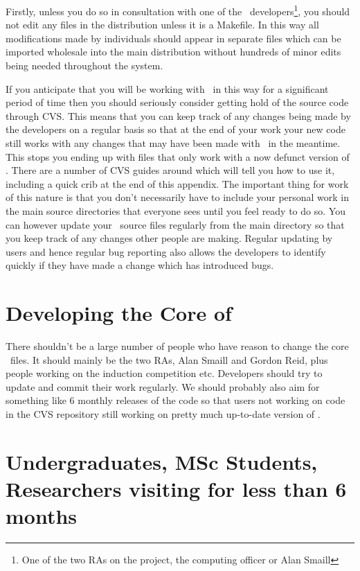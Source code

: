 Firstly, unless you do so in consultation with one of the \lclam\
developers\footnote{One of the two RAs on the project, the computing
  officer or Alan Smaill}, you should not edit any files in the distribution unless it 
is a Makefile\index{Makefile}.  In this way all 
modifications made by individuals should appear in separate files
which can be imported wholesale into the main distribution without
hundreds of minor edits being needed throughout the system.  

If you anticipate that you will be working with \lclam\ in this way
for a significant period of time then you should seriously consider
getting hold of the source code through CVS\index{cvs}.  This means
that you can 
keep track of any changes being made by the developers on a regular
basis so that at the end of your work your new code still works with
any changes that may have been made with \lclam\ in the meantime.
This stops you ending up with files that only work with a now defunct
version of \lclam.  There are a number of CVS guides around which
will tell you how to use it, including a quick crib at the end of this 
appendix.  The important thing for work of this
nature is that you don't necessarily have to include your personal
work in the main source directories that everyone sees until you feel
ready to do so.  You can however update your \lclam\ source files
regularly from the main directory so that you keep track of any
changes other people are making.  Regular updating by users and
hence regular bug reporting also allows the developers to identify
quickly if they have made a change which has introduced bugs.

\section{Developing the Core of \lclam} 
There shouldn't be a large number of people who have reason to change
the core \lclam\ files.  It should mainly be the two RAs, Alan Smaill
and Gordon Reid, plus people working on the induction competition etc.
Developers should try to update and commit their work regularly.  We
should probably also aim for something like 6 monthly releases of the
code so that users not working on code in the CVS repository still
working on pretty much up-to-date version of \lclam.

\section{Undergraduates, MSc Students, Researchers visiting for less
  than 6 months}

